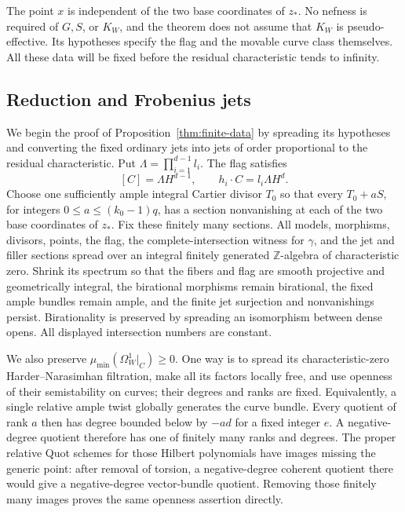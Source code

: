 \documentclass[12pt,a4paper,psamsfonts]{amsart}
\theoremstyle{definition}
\theoremstyle{plain}
\newcommand{\Z}{\mathbb Z}
\begin{document}
The point $x$ is independent of the two base coordinates of $z_*$.
No nefness is required of $G,S$, or $K_W$, and the theorem does not
assume that $K_W$ is pseudo-effective. Its hypotheses specify the
flag and the movable curve class themselves. All these data will
be fixed before the residual characteristic tends to infinity.

\subsection{Reduction and Frobenius jets}
\label{fr:reduction}

We begin the proof of Proposition~\ref{thm:finite-data} by spreading
its hypotheses and converting the fixed ordinary jets
into jets of order proportional to the residual characteristic.
Put
$\Lambda=\prod_{i=1}^{d-1}l_i$. The flag satisfies
\begin{equation}\label{fr:flag-degrees}
 [C]=\Lambda H^{d-1},\qquad h_i\cdot C=l_i\Lambda H^d.
\end{equation}
Choose one sufficiently ample integral Cartier divisor $T_0$ so
that every $T_0+aS$, for integers $0\le a\le(k_0-1)q$, has a section
nonvanishing at each of the two base coordinates of $z_*$.
Fix these finitely many sections. All models, morphisms, divisors,
points, the flag, the complete-intersection witness for $\gamma$,
and the jet and filler sections spread over an integral finitely
generated $\Z$-algebra of characteristic zero. Shrink its
spectrum so that the fibers and flag are smooth projective and
geometrically integral, the birational morphisms remain birational,
the fixed ample bundles remain ample, and the finite jet
surjection and nonvanishings persist. Birationality is preserved
by spreading an isomorphism between dense opens. All displayed
intersection numbers are constant.

We also preserve $\mu_{\min}(\Omega_W^1|_C)\ge0$.
One way is to spread its characteristic-zero Harder--Narasimhan
filtration, make all its factors locally free, and use openness
of their semistability on curves; their degrees and ranks are
fixed. Equivalently, a single relative ample twist globally
generates the curve bundle. Every quotient of rank $a$ then has
degree bounded below by $-ad$ for a fixed integer $e$.
A negative-degree quotient therefore has one of finitely many ranks
and degrees. The proper relative Quot schemes for those Hilbert
polynomials have images missing the generic point: after removal
of torsion, a negative-degree coherent quotient there would
give a negative-degree vector-bundle quotient. Removing those
finitely many images proves the same openness assertion directly.
\end{document}
